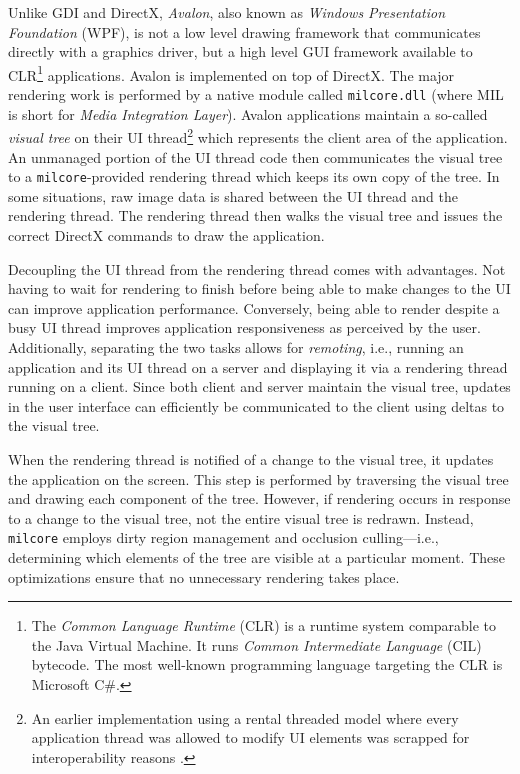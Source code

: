 		\label{sec:milcore}
			Unlike GDI and DirectX, \textit{Avalon}, also known as \textit{Windows Presentation
			Foundation} (WPF),
			is not a low level drawing framework
			that communicates directly with a graphics driver, but a
			high level GUI framework available to CLR\footnote{The \textit{Common
			Language Runtime} (CLR) is a runtime system comparable to the Java Virtual
			Machine. It runs \textit{Common Intermediate Language} (CIL) bytecode.
			The most well-known programming language targeting the CLR is Microsoft
			C\#.} applications. Avalon is
			implemented on top of DirectX. The major rendering work is performed
			by a native module called \texttt{milcore.dll} (where MIL is short for
			\textit{Media Integration Layer}). Avalon applications maintain a
			so-called \textit{visual tree} on their UI thread\footnote{An
			earlier implementation using a rental threaded model where every
			application thread was allowed to modify UI elements was scrapped
			for interoperability reasons \cite{goingdeep}.} which represents the
			client area of the application. An unmanaged portion of the UI thread
			code then communicates the visual tree to a \texttt{milcore}-provided
			rendering thread which keeps its own copy of the tree. In some situations,
			raw image data is shared between the UI thread and the rendering thread. The
			rendering thread then walks the visual tree and issues the correct
			DirectX commands to draw the application.
			\cite{goingdeep,dwmwpf}

			Decoupling the UI thread from the rendering thread comes with
			advantages. Not having to wait for rendering to finish before being
			able to make changes to the UI can improve application performance.
			Conversely, being able to render despite a busy UI thread improves
			application responsiveness as perceived by the user. Additionally,
			separating the two tasks allows for \textit{remoting}, i.e., running
			an application and its UI thread on a server and displaying it
			via a rendering thread running on a client. Since both client and
			server maintain the visual tree, updates in the user interface can
			efficiently be communicated to the client using deltas to the visual
			tree.
			\cite{goingdeep}

			When the rendering thread is notified of a change to the visual tree,
			it updates the application on the screen. This step is performed by
			traversing the visual tree and drawing each component of the tree.
			However, if rendering occurs in response to a change to the visual
			tree, not the entire visual tree is redrawn. Instead, \texttt{milcore}
			employs dirty region management and occlusion culling---i.e.,
			determining which elements of the tree are visible at a particular
			moment. These optimizations ensure that no unnecessary rendering takes
			place.
			\cite{goingdeep}

